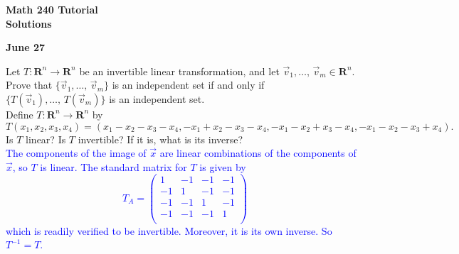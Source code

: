 \documentclass[a4paper,11pt]{article}
\newcommand{\R}{\mathbf{R}}
\newcommand{\BB}[1]{\textcolor{blue}{#1}}
\begin{document}
\begin{center}
  {\Large\bfseries Math 240 Tutorial \\ Solutions}
\end{center}
\begin{center}
  {\bfseries June 27}
\end{center}

 Let $T : \R^n \rightarrow \R^n$ be an invertible
linear transformation, and let $\vec v_1,\dots,\,\vec v_m \in \R^n$. Prove
that $\{\vec v_1,\dots,\,\vec v_m\}$ is an independent set if and only if
$\{T(\vec v_1),\dots,\,T(\vec v_m)\}$ is an independent set. \\



 Define $T : \R^n \rightarrow \R^n$ by
\[
  T(x_1,x_2,x_3,x_4) =
  (x_1-x_2-x_3-x_4, -x_1+x_2-x_3-x_4,-x_1-x_2+x_3-x_4,-x_1-x_2-x_3+x_4).
\]
Is $T$ linear? Is $T$ invertible? If it is, what is its inverse? \\

\BB{The components of the image of $\vec x$ are linear combinations of the
  components of $\vec x$, so $T$ is linear. The standard matrix for $T$ is given
  by
  \[
    T_A = 
    \left(
      \begin{array}{rrrr}
        1 & -1 & -1 & -1 \\
        -1 & 1 & -1 & -1 \\
        -1 & -1 & 1 & -1 \\
        -1 & -1 & -1 & 1 \\
      \end{array}
    \right)
  \]
  which is readily verified to be invertible. Moreover, it is its own inverse.
  So $T^{-1}=T$. \\
}
\end{document}
